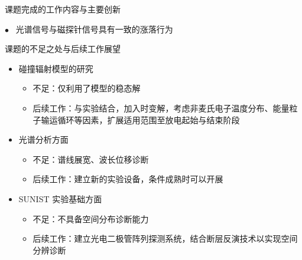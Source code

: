 \begin{frame}{课题完成的工作内容与主要创新}
\begin{itemize}
\begin{itemize}
\begin{itemize}
{							{\color{bulletcolor}\quad\tiny{}\hbox{{$\bullet$}}}~ 光谱信号与磁探针信号具有一致的涨落行为
						}
					\end{itemize}
			\end{itemize}
	\end{itemize}
\end{frame}

\begin{frame}{课题的不足之处与后续工作展望}
	\begin{itemize}
		\item 碰撞辐射模型的研究
			\begin{itemize}
				\item 不足：仅利用了模型的稳态解
				\item 后续工作：与实验结合，加入时变解，考虑非麦氏电子温度分布、能量粒子输运循环等因素，扩展适用范围至放电起始与结束阶段
			\end{itemize}
		\bigskip
		\item 光谱分析方面
			\begin{itemize}
				\item 不足：谱线展宽、波长位移诊断
				\item 后续工作：建立新的实验设备，条件成熟时可以开展
			\end{itemize}
		\bigskip
		\item SUNIST 实验基础方面
			\begin{itemize}
				\item 不足：不具备空间分布诊断能力
				\item 后续工作：建立光电二极管阵列探测系统，结合断层反演技术以实现空间分辨诊断%
			\end{itemize}
	\end{itemize}
\end{frame}

